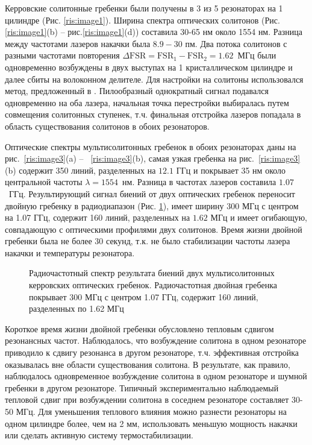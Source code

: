 Керровские солитонные гребенки были получены в 3 из 5 резонаторах на 1 цилиндре (Рис. \ref{ris:image1}). Ширина спектра оптических солитонов (Рис.\ref{ris:image1}(b) -- рис.\ref{ris:image1}(d)) составила 30-65 нм около 1554 нм. Разница между частотами лазеров накачки была $8.9-30$ пм. Два потока солитонов с разными частотами повторения $\Delta\mbox{FSR} = \mbox{FSR}_1 - \mbox{FSR}_2 = 1.62$~МГц были одновременно возбуждены в двух выступах на 1 кристаллическом цилиндре и далее сбиты на волоконном делителе. Для настройки на солитоны использовался метод, предложенный в \cite{Herr2014}. Пилообразный однократный сигнал подавался одновременно на оба лазера, начальная точка перестройки выбиралась путем совмещения солитонных ступенек, т.ч. финальная отстройка лазеров попадала в область существования солитонов в обоих резонаторов.

Оптические спектры мультисолитонных гребенок в обоих резонаторах даны на рис.~\ref{ris:image3}(a) -- ~\ref{ris:image3}(b), самая узкая гребенка на рис.~\ref{ris:image3}(b) содержит 350 линий, разделенных на $12.1$ ГГц и покрывает 35 нм около центральной частоты $\lambda = 1554$~нм. Разница в частотах лазеров составила $1.07$~ГГц. Результирующий сигнал биений от двух оптических гребенок переносит двойную гребенку в радиодиапазон (Рис. \ref{ris:image4}), имеет ширину 300 МГц с центром на 1.07 ГГц, содержит 160 линий, разделенных на $1.62$ МГц и имеет огибающую, совпадающую с оптическими профилями двух солитонов. Время жизни двойной гребенки была не более 30 секунд, т.к. не было стабилизации частоты лазера накачки и температуры резонатора.

\begin{figure}[ht]
\begin{minipage}[ht]{1\linewidth}
\end{minipage}
\caption{Радиочастотный спектр результата биений двух мультисолитонных керровских оптических гребенок. Радиочастотная двойная гребенка покрывает 300 МГц с центром 1.07 ГГц, содержит 160 линий, разделенных по 1.62 МГц}
\label{ris:image4}
\end{figure}

Короткое время жизни двойной гребенки обусловлено тепловым сдвигом резонансных частот. Наблюдалось, что возбуждение солитона в одном резонаторе приводило к сдвигу резонанса в другом резонаторе, т.ч. эффективная отстройка оказывалась вне области существования солитона. В результате, как правило, наблюдалось одновременное возбуждение солитона в одном резонаторе и шумной гребенки в другом резонаторе. Типичный экспериментально наблюдаемый тепловой сдвиг при возбуждении солитона в соседнем резонаторе составляет 30-50 МГц. Для уменьшения теплового влияния можно разнести резонаторы на одном цилиндре более, чем на 2 мм, использовать меньшую мощность накачки или сделать активную систему термостабилизации.

